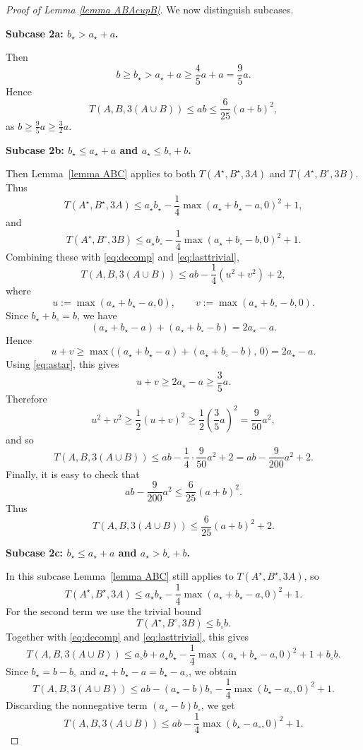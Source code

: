 \documentclass[12pt, notitlepage]{amsart}
\numberwithin{equation}{section}
\theoremstyle{remark}
\theoremstyle{definition}
\theoremstyle{remark}
\numberwithin{equation}{section}
\begin{document}
\begin{proof}[Proof of Lemma \ref{lemma ABAcupB}]
We now distinguish subcases.

\medskip
\noindent\textbf{Subcase 2a: $b_{\star}>a_{\star}+a$.}

Then
\[
b\ge b_{\star}>a_{\star}+a\ge \frac45a+a=\frac95a.
\]
Hence
\[
T(A,B,3(A\cup B))\le ab\le \frac6{25}(a+b)^2,
\]
as $b\ge \frac95a\ge\frac32a$.

\medskip
\noindent\textbf{Subcase 2b: $b_{\star}\le a_{\star}+a$ and $a_{\star}\le b_{\circ}+b$.}

Then Lemma~\ref{lemma ABC} applies to both $T(A^{\star},B^{\star},3A)$ and $T(A^{\star},B^{\circ},3B)$. Thus
\[
T(A^{\star},B^{\star},3A)
\le
a_{\star}b_{\star}
-\frac14\max(a_{\star}+b_{\star}-a,0)^2
+1,
\]
and
\[
T(A^{\star},B^{\circ},3B)
\le
a_{\star}b_{\circ}
-\frac14\max(a_{\star}+b_{\circ}-b,0)^2
+1.
\]
Combining these with \eqref{eq:decomp} and \eqref{eq:lasttrivial},
\[
T(A,B,3(A\cup B))
\le
ab
-\frac14(u^2+v^2)
+2,
\]
where
\[
u:=\max(a_{\star}+b_{\star}-a,0),\qquad
v:=\max(a_{\star}+b_{\circ}-b,0).
\]
Since $b_{\star}+b_{\circ}=b$, we have
\[
(a_{\star}+b_{\star}-a)+(a_{\star}+b_{\circ}-b)=2a_{\star}-a.
\]
Hence
\[
u+v
\ge
\max\bigl((a_{\star}+b_{\star}-a)+(a_{\star}+b_{\circ}-b),\,0\bigr)
=
2a_{\star}-a.
\]
Using \eqref{eq:astar}, this gives
\[
u+v\ge 2a_{\star}-a\ge \frac35a.
\]
Therefore
\[
u^2+v^2\ge \frac12(u+v)^2\ge \frac12\left(\frac35a\right)^2=\frac{9}{50}a^2,
\]
and so
\[
T(A,B,3(A\cup B))
\le
ab-\frac14\cdot \frac{9}{50}a^2+2
=
ab-\frac{9}{200}a^2+2.
\]
Finally, it is easy to check that 
\[
ab-\frac{9}{200}a^2\le \frac6{25}(a+b)^2
.\]
Thus
\[
T(A,B,3(A\cup B))\le \frac6{25}(a+b)^2+2.
\]

\medskip
\noindent\textbf{Subcase 2c: $b_{\star}\le a_{\star}+a$ and $a_{\star}>b_{\circ}+b$.}

In this subcase Lemma~\ref{lemma ABC} still applies to $T(A^{\star},B^{\star},3A)$, so
\[
T(A^{\star},B^{\star},3A)
\le
a_{\star}b_{\star}
-\frac14\max(a_{\star}+b_{\star}-a,0)^2
+1.
\]
For the second term we use the trivial bound
\[
T(A^{\star},B^{\circ},3B)\le b_{\circ}b.
\]
Together with \eqref{eq:decomp} and \eqref{eq:lasttrivial}, this gives
\[
T(A,B,3(A\cup B))
\le
a_{\circ}b
+
a_{\star}b_{\star}
-\frac14\max(a_{\star}+b_{\star}-a,0)^2
+1
+
b_{\circ}b.
\]
Since $b_{\star}=b-b_{\circ}$ and $a_{\star} + b_{\star} - a = b_{\star} - a_{\circ}$, we obtain
\[
T(A,B,3(A\cup B))
\le
ab
-
(a_{\star}-b)b_{\circ}
-
\frac14\max(b_{\star}-a_{\circ},0)^2
+1.
\]
Discarding the nonnegative term $(a_{\star}-b)b_{\circ}$, we get
\begin{equation}
\label{eq:subcase2c-main}
T(A,B,3(A\cup B))
\le
ab
-
\frac14\max(b_{\star}-a_{\circ},0)^2
+1.
\end{equation}


\end{proof}
\end{document}
